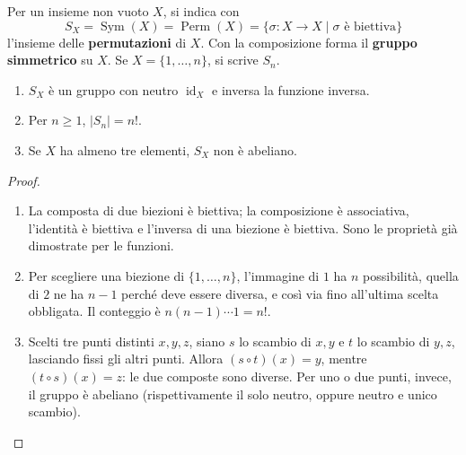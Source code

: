 \begin{definizione}
Per un insieme non vuoto $X$, si indica con
\[
S_X=\operatorname{Sym}(X)=\operatorname{Perm}(X)
   =\{\sigma:X\to X\mid\sigma\text{ è biettiva}\}
\]
l'insieme delle \textbf{permutazioni} di $X$. Con la composizione forma il \textbf{gruppo simmetrico} su $X$. Se $X=\{1,\ldots,n\}$, si scrive $S_n$.
\end{definizione}

\begin{proposizione}\label{prop:simmetrico}
\begin{enumerate}[label=\arabic*.]
\item $S_X$ è un gruppo con neutro $\operatorname{id}_X$ e inversa la funzione inversa.
\item Per $n\ge1$, $|S_n|=n!$.
\item Se $X$ ha almeno tre elementi, $S_X$ non è abeliano.
\end{enumerate}
\end{proposizione}
\begin{proof}
\begin{enumerate}[label=\arabic*.]
\item La composta di due biezioni è biettiva; la composizione è associativa, l'identità è biettiva e l'inversa di una biezione è biettiva. Sono le proprietà già dimostrate per le funzioni.
\item Per scegliere una biezione di $\{1,\ldots,n\}$, l'immagine di $1$ ha $n$ possibilità, quella di $2$ ne ha $n-1$ perché deve essere diversa, e così via fino all'ultima scelta obbligata. Il conteggio è $n(n-1)\cdots1=n!$.
\item Scelti tre punti distinti $x,y,z$, siano $s$ lo scambio di $x,y$ e $t$ lo scambio di $y,z$, lasciando fissi gli altri punti. Allora $(s\circ t)(x)=y$, mentre $(t\circ s)(x)=z$: le due composte sono diverse. Per uno o due punti, invece, il gruppo è abeliano (rispettivamente il solo neutro, oppure neutro e unico scambio).
\end{enumerate}
\end{proof}

